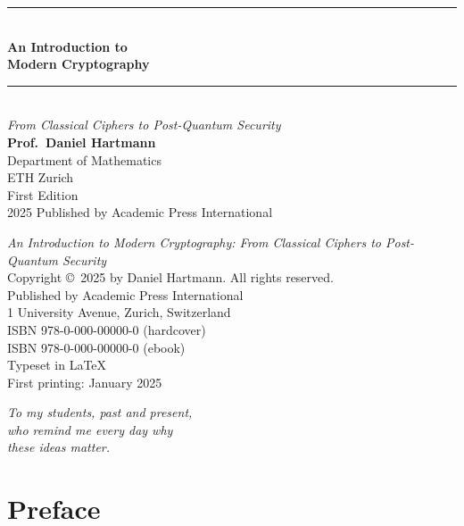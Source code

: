 \documentclass[12pt,a4paper,openany]{book}
\theoremstyle{definition}
\theoremstyle{plain}
\begin{document}
\begin{titlepage}
\centering
\vspace*{3cm}
{\color{chaptercolor}\rule{\textwidth}{2pt}}\\[1.5cm]
{\fontsize{36}{44}\selectfont\bfseries\color{chaptercolor}
  An Introduction to\\[0.5cm]
  Modern Cryptography}\\[1cm]
{\color{chaptercolor}\rule{0.5\textwidth}{1pt}}\\[1.5cm]
{\Large\textit{From Classical Ciphers to Post-Quantum Security}}\\[2cm]
{\LARGE\bfseries Prof.\ Daniel Hartmann}\\[0.3cm]
{\large Department of Mathematics\\ETH Zurich}\\[3cm]
{\large First Edition\\2025}
\vfill
{\small Published by Academic Press International}
\end{titlepage}

\thispagestyle{empty}
\vspace*{\fill}
\noindent\textit{An Introduction to Modern Cryptography: From Classical Ciphers to Post-Quantum Security}\\[0.5cm]
\noindent Copyright \copyright\ 2025 by Daniel Hartmann. All rights reserved.\\[0.5cm]
\noindent Published by Academic Press International\\
1 University Avenue, Zurich, Switzerland\\[0.5cm]
\noindent ISBN 978-0-000-00000-0 (hardcover)\\
ISBN 978-0-000-00000-0 (ebook)\\[0.5cm]
\noindent Typeset in \LaTeX\\
First printing: January 2025
\clearpage

\frontmatter

\thispagestyle{empty}
\vspace*{5cm}
\begin{center}
\textit{To my students, past and present,\\who remind me every day why\\these ideas matter.}
\end{center}
\clearpage

\chapter{Preface}
\end{document}
